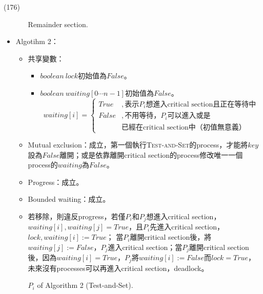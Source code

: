 \begin{theorem}{(176)}
\begin{itemize}
\begin{itemize}
\begin{algorithm}[H]
\begin{algorithmic}[1]
                        \State Remainder section.
                    \EndFunction
                \end{algorithmic}
            \end{algorithm}
        \end{itemize}
        \item Algotihm 2：\begin{itemize}
            \item 共享變數：\begin{itemize}
                \item $boolean \ lock$初始值為$False$。
                \item $boolean \ waiting[0 \cdots n - 1]$初始值為$False$。\begin{equation}
                    waiting[i] = \begin{cases}
                        True &, \text{表示}P_i\text{想進入critical section且正在等待中} \\
                        False &, \text{不用等待，}P_i\text{可以進入或是}\\ & \text{已經在critical section中（初值無意義）}
                    \end{cases}
                \end{equation}
            \end{itemize}
            \item Mutual exclusion：成立，第一個執行\textsc{Test-and-Set}的process，才能將$key$設為$False$離開；或是依靠離開critical section的process修改唯一一個process的$waiting$為$False$。
            \item Progress：成立。
            \item Bounded waiting：成立。
            \item 若移除，則違反progress，若僅$P_i$和$P_j$想進入critical section，$waiting[i], waiting[j] = True$，且$P_i$先進入critical section，$lock, waiting[i] := True$；
            當$P_i$離開critical section後，將$waiting[j] := False$，$P_j$進入critical section；當$P_j$離開critical section後，因為$waiting[i] = True$，$P_j$將$waiting[i] := False$而$lock = True$，未來沒有processes可以再進入critical section，deadlock。
            \begin{algorithm}[H]
                \caption{$P_i$ of Algorithm 2 (Test-and-Set).}
                \label{algo:test-and-set-algo-2}
                \begin{algorithmic}[1]

\end{algorithmic}
\end{algorithm}
\end{itemize}
\end{itemize}
\end{theorem}
